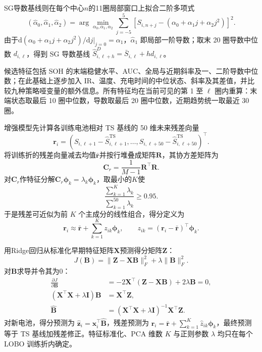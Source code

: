 \documentclass[withoutpreface]{cumcmthesis}
\newcommand{\TS}{\mathrm{TS}}
\begin{document}
SG导数基线则在每个中心$n$的11圈局部窗口上拟合二阶多项式
\begin{equation}
(\widehat\alpha_0,\widehat\alpha_1,\widehat\alpha_2)
=\arg\min_{\alpha_0,\alpha_1,\alpha_2}
\sum_{j=-5}^{5}\left[S_{i,n+j}-(\alpha_0+\alpha_1j+\alpha_2j^2)\right]^2.
\end{equation}
由于$\mathrm d(\alpha_0+\alpha_1j+\alpha_2j^2)/\mathrm dj|_{j=0}=\alpha_1$，$\widehat\alpha_1$ 即局部一阶导数；取末 20 圈导数中位数 $d_{i,\ell}$，得到 SG 导数基线 $\widehat S_{i,\ell+h}^{D}=\bar S_{i,\ell}+hd_{i,\ell}$。

候选特征包括 SOH 的末端稳健水平、AUC、全局与近期斜率及一、二阶导数中位数；在此基础上逐步加入 IR、温度、充电时间的中位状态、斜率及其差值，并比较九种策略哑变量的额外信息。所有特征均在当前可见的第 1 至 $\ell$ 圈内重算：末端状态取最后 10 圈中位数，导数取最后 20 圈中位数，近期趋势统一取最近 30 圈。

增强模型先计算各训练电池相对 TS 基线的 50 维未来残差向量
\begin{equation}
\mathbf r_i=
\left(S_{i,\ell+1}-\widehat S_{i,\ell+1}^{\TS},\ldots,
S_{i,\ell+50}-\widehat S_{i,\ell+50}^{\TS}\right)^{\!\top}.
\end{equation}
将训练折的残差向量减去均值$\bar{\mathbf r}$并按行堆叠成矩阵$\mathbf R$，其协方差矩阵为
\begin{equation}
\mathbf C_r=\frac{1}{M-1}\mathbf R^{\top}\mathbf R.
\end{equation}
对$\mathbf C_r$作特征分解$\mathbf C_r\boldsymbol\phi_k=\lambda_k\boldsymbol\phi_k$，取最小的$K$使
\begin{equation}
\frac{\sum_{k=1}^{K}\lambda_k}{\sum_{k=1}^{50}\lambda_k}\ge0.95.
\end{equation}
于是残差可近似为前 $K$ 个主成分的线性组合，得分定义为
\begin{equation}
\mathbf r_i\approx\bar{\mathbf r}+\sum_{k=1}^{K}z_{ik}\boldsymbol\phi_k,
\qquad
z_{ik}=(\mathbf r_i-\bar{\mathbf r})^{\top}\boldsymbol\phi_k.
\end{equation}

用Ridge回归\cite{hoerl1970}从标准化早期特征矩阵$\mathbf X$预测得分矩阵$\mathbf Z$：
\begin{equation}
J(\mathbf B)=\|\mathbf Z-\mathbf X\mathbf B\|_F^2
+\lambda\|\mathbf B\|_F^2.
\end{equation}
对$\mathbf B$求导并令其为0：
\begin{align}
\frac{\partial J}{\partial\mathbf B}
&=-2\mathbf X^{\top}(\mathbf Z-\mathbf X\mathbf B)+2\lambda\mathbf B=0,\\
(\mathbf X^{\top}\mathbf X+\lambda\mathbf I)\mathbf B
&=\mathbf X^{\top}\mathbf Z,\\
\widehat{\mathbf B}
&=(\mathbf X^{\top}\mathbf X+\lambda\mathbf I)^{-1}\mathbf X^{\top}\mathbf Z.
\end{align}
对新电池，得分预测为 $\widehat{\mathbf z}_i=\mathbf x_i^{\top}\widehat{\mathbf B}$，残差预测为 $\widehat{\mathbf r}_i=\bar{\mathbf r}+\sum_{k=1}^{K}\widehat z_{ik}\boldsymbol\phi_k$，最终预测等于 TS 基线加残差修正。特征标准化、PCA 维数 $K$ 与正则参数 $\lambda$ 均只在每个 LOBO 训练折内确定。
\end{document}
